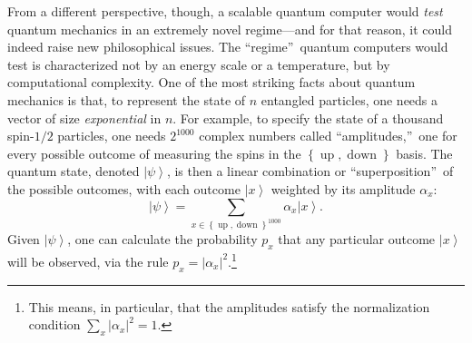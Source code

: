 \documentclass[12pt,onecolumn]{article}%
\begin{document}
From a different perspective, though, a scalable quantum computer would
\textit{test }quantum mechanics\textit{ }in an extremely novel regime---and
for that reason, it could indeed raise new philosophical issues. The
\textquotedblleft regime\textquotedblright\  quantum computers would test is
characterized not by an energy scale or a temperature, but by computational
complexity. One of the most striking facts about quantum mechanics is that,
to represent the state of $n$ entangled particles, one needs a vector of size
\textit{exponential} in $n$. For example, to specify the state of a
thousand spin-$1/2$ particles, one needs $2^{1000}$ complex numbers called
\textquotedblleft amplitudes,\textquotedblright\  one for every possible
outcome of measuring the spins in the $\left\{  \operatorname*{up}%
,\operatorname*{down}\right\}  $ basis. The quantum state, denoted
$\left\vert \psi\right\rangle $, is then a linear combination or
\textquotedblleft superposition\textquotedblright\  of the possible outcomes,
with each outcome $\left\vert x\right\rangle $ weighted by its amplitude
$\alpha_{x}$:%
\[
\left\vert \psi\right\rangle =\sum_{x\in\left\{  \operatorname*{up}%
,\operatorname*{down}\right\}  ^{1000}}\alpha_{x}\left\vert x\right\rangle .
\]
Given $\left\vert \psi\right\rangle $, one can calculate the probability
$p_{x}$ that any particular outcome $\left\vert x\right\rangle $ will be
observed, via the rule $p_{x}=\left\vert \alpha_{x}\right\vert ^{2}%
$.\footnote{This means, in particular, that the amplitudes satisfy the
normalization condition $\sum_{x}\left\vert \alpha_{x}\right\vert ^{2}=1$.}
\end{document}
